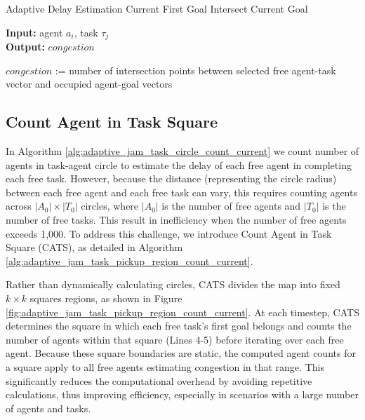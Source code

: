 \documentclass[letterpaper]{article} %
\begin{document}
\begin{algorithm}
    \caption{Adaptive Delay Estimation Current First Goal Intersect Current Goal}
    \label{alg:adaptive_jam_curr_pickup_intersect_curr_goal} 
    \textbf{Input:} agent $a_i$, task $\tau_j$ \\
    \textbf{Output:} $congestion$
    \begin{algorithmic}[1]

    \STATE $congestion$ := number of intersection points between selected free agent-task vector and occupied agent-goal vectors            

    \end{algorithmic}
\end{algorithm}


\subsection{Count Agent in Task Square}
\label{sec:adaptive_jam_task_pickup_region_count_current}


In Algorithm \ref{alg:adaptive_jam_task_circle_count_current} 
we count number of agents 
in task-agent circle to estimate the delay of each free agent in completing each free task. 
However, because the distance (representing the circle radius) between each free agent and each free task can vary, 
this requires counting agents across $|A_0| \times |T_0|$ circles, 
where $|A_0|$ is the number of free agents and $|T_0|$ is the number of free tasks. 
This result in inefficiency when the number of free agents exceeds 1,000. 
To address this challenge, we introduce Count Agent in Task Square (CATS), as detailed in Algorithm \ref{alg:adaptive_jam_task_pickup_region_count_current}. 


 Rather than dynamically calculating circles, CATS divides the map into fixed $k \times k$ squares regions, as shown in Figure \ref{fig:adaptive_jam_task_pickup_region_count_current}.
At each timestep, CATS determines the square in which each free task’s first goal belongs and counts the number of agents within that square (Lines 4-5) before iterating over each free agent. 
Because these square boundaries are static, the computed agent counts for a square apply to all free agents estimating congestion in that range. 
This significantly reduces the computational overhead by avoiding repetitive calculations, thus improving efficiency, especially in scenarios with a large number of agents and tasks. 
\end{document}
